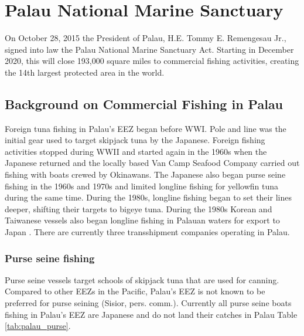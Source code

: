 \documentclass[11pt,english]{article}
\begin{document}
\section{Palau National Marine Sanctuary}\label{PNMS}


On October 28, 2015 the President of Palau, H.E. Tommy E. Remengesau Jr., signed into law the Palau National Marine Sanctuary Act. Starting in December 2020, this will close 193,000 square miles to commercial fishing activities, creating the 14th largest protected area in the world. 

\subsection{Background on Commercial Fishing in Palau}\label{Palau_back}

Foreign tuna fishing in Palau’s EEZ began before WWI. Pole and line was the initial gear used to target skipjack tuna by the Japanese. Foreign fishing activities stopped during WWII and started again in the 1960s when the Japanese returned and the locally based Van Camp Seafood Company carried out fishing with boats crewed by Okinawans. The Japanese also began purse seine fishing in the 1960s and 1970s and limited longline fishing for yellowfin tuna during the same time. During the 1980s, longline fishing began to set their lines deeper, shifting their targets to bigeye tuna. During the 1980s Korean and Taiwanese vessels also began longline fishing in Palauan waters for export to Japan \citep{chapman2000development}. There are currently three transshipment companies operating in Palau.

\subsubsection{Purse seine fishing}

Purse seine vessels target schools of skipjack tuna that are used for canning. Compared to other EEZs in the Pacific, Palau’s EEZ is not known to be preferred for purse seining (Sisior, pers. comm.). Currently all purse seine boats fishing in Palau’s EEZ are Japanese and do not land their catches in Palau Table \ref{tab:palau_purse}. 

%
\end{document}
